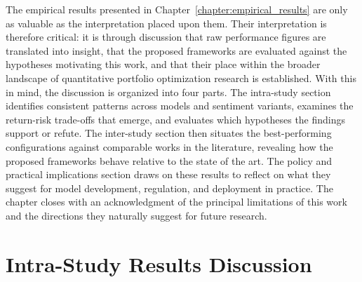 The empirical results presented in Chapter~\ref{chapter:empirical_results} are only as valuable as the interpretation placed upon them. Their interpretation is therefore critical: it is through discussion that raw performance figures are translated into insight, that the proposed frameworks are evaluated against the hypotheses motivating this work, and that their place within the broader landscape of quantitative portfolio optimization research is established. With this in mind, the discussion is organized into four parts. The intra-study section identifies consistent patterns across models and sentiment variants, examines the return-risk trade-offs that emerge, and evaluates which hypotheses the findings support or refute. The inter-study section then situates the best-performing configurations against comparable works in the literature, revealing how the proposed frameworks behave relative to the state of the art. The policy and practical implications section draws on these results to reflect on what they suggest for model development, regulation, and deployment in practice. The chapter closes with an acknowledgment of the principal limitations of this work and the directions they naturally suggest for future research.


\section{Intra-Study Results Discussion}
\label{sec:intra}

